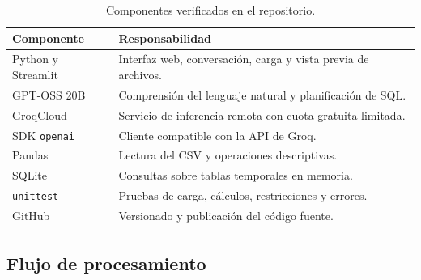 \documentclass[11pt,a4paper]{article}
\begin{document}
\begin{table}[H]
\centering
\small
\caption{Componentes verificados en el repositorio.}

\begin{tabularx}{\textwidth}{@{}p{3cm}X@{}}
\toprule
\textbf{Componente} & \textbf{Responsabilidad}\\
\midrule

Python y Streamlit &
Interfaz web, conversación, carga y vista previa de archivos.\\

GPT-OSS 20B &
Comprensión del lenguaje natural y planificación de SQL.\\

GroqCloud &
Servicio de inferencia remota con cuota gratuita limitada.\\

SDK \texttt{openai} &
Cliente compatible con la API de Groq.\\

Pandas &
Lectura del CSV y operaciones descriptivas.\\

SQLite &
Consultas sobre tablas temporales en memoria.\\

\texttt{unittest} &
Pruebas de carga, cálculos, restricciones y errores.\\

GitHub &
Versionado y publicación del código fuente.\\

\bottomrule
\end{tabularx}
\end{table}

\subsection{Flujo de procesamiento}
\end{document}
